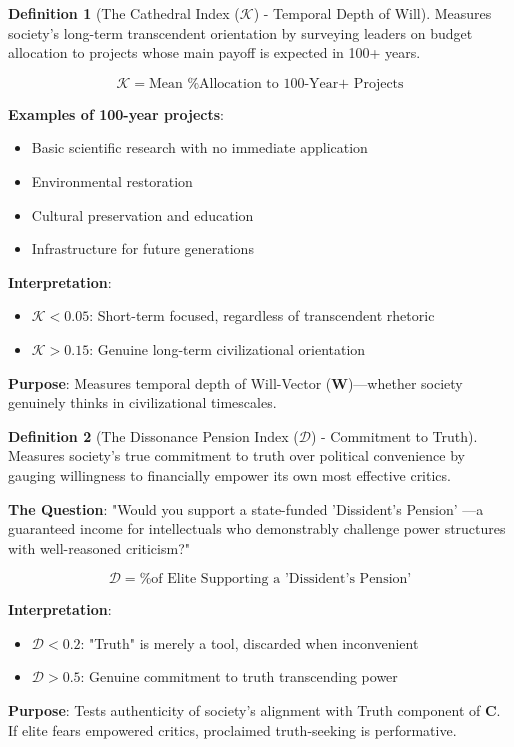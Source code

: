 \documentclass[11pt,a4paper]{article}
\theoremstyle{definition}
\newtheorem{definition}{Definition}[section]
\theoremstyle{remark}
\begin{document}
\begin{definition}[The Cathedral Index (\(\mathcal{K}\)) - Temporal Depth of Will]
Measures society's long-term transcendent orientation by surveying leaders on budget allocation to projects whose main payoff is expected in 100+ years.

\begin{equation}
\mathcal{K} = \text{Mean \% Allocation to 100-Year+ Projects}
\end{equation}

\textbf{Examples of 100-year projects}:
\begin{itemize}
    \item Basic scientific research with no immediate application
    \item Environmental restoration
    \item Cultural preservation and education
    \item Infrastructure for future generations
\end{itemize}

\textbf{Interpretation}:
\begin{itemize}
    \item \(\mathcal{K} < 0.05\): Short-term focused, regardless of transcendent rhetoric
    \item \(\mathcal{K} > 0.15\): Genuine long-term civilizational orientation
\end{itemize}

\textbf{Purpose}: Measures temporal depth of Will-Vector (\(\mathbf{W}\))—whether society genuinely thinks in civilizational timescales.
\end{definition}

\begin{definition}[The Dissonance Pension Index (\(\mathcal{D}\)) - Commitment to Truth]
Measures society's true commitment to truth over political convenience by gauging willingness to financially empower its own most effective critics.

\textbf{The Question}: "Would you support a state-funded 'Dissident's Pension' —a guaranteed income for intellectuals who demonstrably challenge power structures with well-reasoned criticism?"

\begin{equation}
\mathcal{D} = \text{\% of Elite Supporting a 'Dissident's Pension'}
\end{equation}

\textbf{Interpretation}:
\begin{itemize}
    \item \(\mathcal{D} < 0.2\): "Truth" is merely a tool, discarded when inconvenient
    \item \(\mathcal{D} > 0.5\): Genuine commitment to truth transcending power
\end{itemize}

\textbf{Purpose}: Tests authenticity of society's alignment with Truth component of \(\mathbf{C}\). If elite fears empowered critics, proclaimed truth-seeking is performative.
\end{definition}
\end{document}
